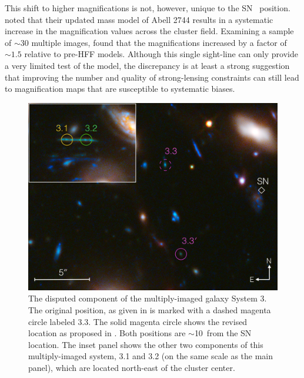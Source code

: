 This shift to higher magnifications is not, however, unique to the
SN \tomas\ position.  \citet{Jauzac:2014c} noted that their updated
mass model of Abell 2744 results in a systematic increase in the
magnification values across the cluster field. Examining a sample of
$\sim$30 multiple images, \citeauthor{Jauzac:2014c} found that the
magnifications increased by a factor of $\sim1.5$ relative to pre-HFF
models.  Although this single sight-line can only provide a very
limited test of the model, the \changeG{$4.3\sigma$} discrepancy is at
least a strong suggestion that improving the number and quality of
strong-lensing constraints can still lead to magnification maps that
are susceptible to systematic biases.


\begin{figure}
\begin{center}
\includegraphics[width=\columnwidth]{FIG/system3.png}
\caption{ 
The disputed component of the multiply-imaged galaxy System 3. The
original position, as given in \citet{Merten:2011} is marked with a
dashed magenta circle labeled 3.3. The solid magenta circle shows the
revised location as proposed in \citet{Jauzac:2014c}.  Both positions
are $\sim$10\arcsec\ from the SN location.  The inset panel shows the
other two components of this multiply-imaged system, 3.1 and 3.2 (on
the same scale as the main panel), which are located north-east of the
cluster center.
\label{fig:system3} }
\end{center}
\end{figure}

